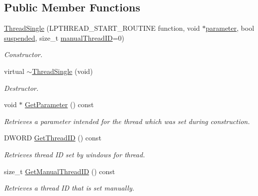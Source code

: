\subsection*{Public Member Functions}
\begin{DoxyCompactItemize}
\item 
\hyperlink{class_thread_single_a05dabadec4ddc67da1a7996100d87ad2}{ThreadSingle} (LPTHREAD\_\-START\_\-ROUTINE function, void $\ast$\hyperlink{class_thread_single_ad0aa14d604bca6bb1ba5ec5721cd859c}{parameter}, bool \hyperlink{class_thread_single_a710b7388ce616e858f776efab32fbe61}{suspended}, size\_\-t \hyperlink{class_thread_single_a43cc2e11c57294cfcf6f61ef9754f70b}{manualThreadID}=0)
\begin{DoxyCompactList}\small\item\em Constructor. \item\end{DoxyCompactList}\item 
virtual \hyperlink{class_thread_single_aac16bed03e62d0979d0fcbd9f081d9ee}{$\sim$ThreadSingle} (void)
\begin{DoxyCompactList}\small\item\em Destructor. \item\end{DoxyCompactList}\item 
void $\ast$ \hyperlink{class_thread_single_a1322c3db9a09abccc1dc38f16ee24c64}{GetParameter} () const 
\begin{DoxyCompactList}\small\item\em Retrieves a parameter intended for the thread which was set during construction. \item\end{DoxyCompactList}\item 
DWORD \hyperlink{class_thread_single_aa8b68a8122e71d6fb906e8d03b159b35}{GetThreadID} () const 
\begin{DoxyCompactList}\small\item\em Retrieves thread ID set by windows for thread. \item\end{DoxyCompactList}\item 
size\_\-t \hyperlink{class_thread_single_a43ec2b66ea0f36e97701dea573fa966e}{GetManualThreadID} () const 
\begin{DoxyCompactList}\small\item\em Retrieves a thread ID that is set manually. \item\end{DoxyCompactList}\item 

\end{DoxyCompactItemize}

